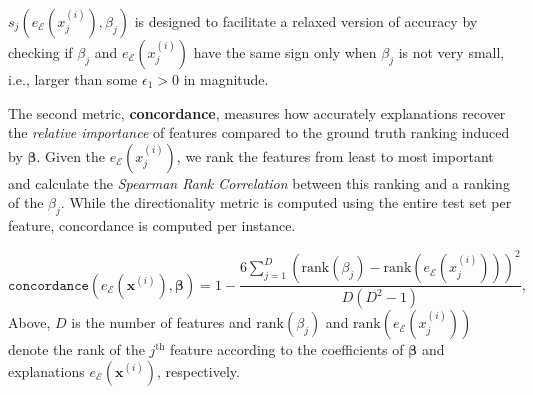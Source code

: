 \documentclass[mnsc,blindrev]{informs3}
\newcommand{\mE}{\mathcal{E}}
\begin{document}
    $s_j(e_\mE(x^{(i)}_j),\beta_j)$ is designed to facilitate a relaxed version of accuracy by checking if $\beta_j$ and $e_\mE(x^{(i)}_j)$ have the same sign only when $\beta_j$ is not very small, i.e., larger than some $\epsilon_1> 0$ in magnitude. %
    
      The second metric, \textbf{concordance}, measures how accurately explanations recover the \textit{relative importance} of features compared to the ground truth ranking induced by $\boldsymbol{\beta}$. Given the $e_\mathcal{E}(x^{(i)}_j)$, we rank the features from least to most important and calculate the \emph{Spearman Rank Correlation} \citep{spearman1904proof} between this ranking and a ranking of the $\beta_j$. While the directionality metric is computed using the entire test set per feature, concordance is computed per instance.

    \begin{equation}
       \texttt{concordance}(e_\mE(\mathbf{x}^{(i)}),\boldsymbol{\beta}) = 1 - \frac{6\sum_{j=1}^D (\text{rank}(\beta_j) - \text{rank}(e_\mE(x^{(i)}_j)))^2}{D(D^2-1)},
    \end{equation}
    Above, $D$ is the number of features and $\text{rank}(\beta_j)$ and $\text{rank}(e_\mE(x^{(i)}_j))$ denote the rank of the $j^{\text{th}}$ feature according to the coefficients of $\boldsymbol{\beta}$ and explanations $e_\mE(\mathbf{x}^{(i)})$, respectively. %
    
\end{document}

